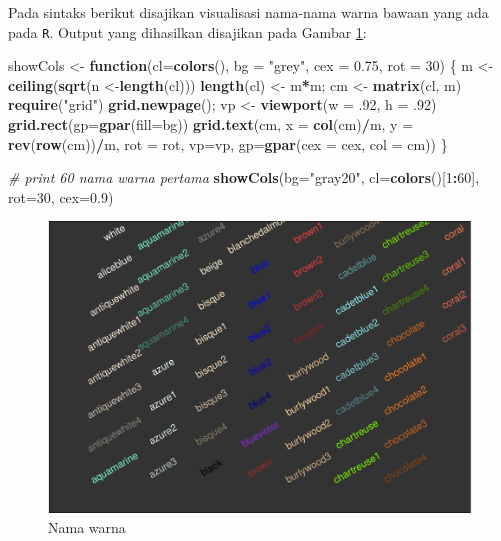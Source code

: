 \documentclass[]{book}
\newenvironment{Shaded}{\begin{snugshade}}{\end{snugshade}}
\newcommand{\KeywordTok}[1]{\textcolor[rgb]{0.13,0.29,0.53}{\textbf{#1}}}
\newcommand{\DataTypeTok}[1]{\textcolor[rgb]{0.13,0.29,0.53}{#1}}
\newcommand{\DecValTok}[1]{\textcolor[rgb]{0.00,0.00,0.81}{#1}}
\newcommand{\FloatTok}[1]{\textcolor[rgb]{0.00,0.00,0.81}{#1}}
\newcommand{\StringTok}[1]{\textcolor[rgb]{0.31,0.60,0.02}{#1}}
\newcommand{\CommentTok}[1]{\textcolor[rgb]{0.56,0.35,0.01}{\textit{#1}}}
\newcommand{\ControlFlowTok}[1]{\textcolor[rgb]{0.13,0.29,0.53}{\textbf{#1}}}
\newcommand{\OperatorTok}[1]{\textcolor[rgb]{0.81,0.36,0.00}{\textbf{#1}}}
\newcommand{\NormalTok}[1]{#1}
\begin{document}
Pada sintaks berikut disajikan visualisasi nama-nama warna bawaan yang
ada pada \texttt{R}. Output yang dihasilkan disajikan pada Gambar
\ref{fig:color}:

\begin{Shaded}
\begin{Highlighting}[]
\NormalTok{showCols <-}\StringTok{ }\ControlFlowTok{function}\NormalTok{(}\DataTypeTok{cl=}\KeywordTok{colors}\NormalTok{(), }\DataTypeTok{bg =} \StringTok{"grey"}\NormalTok{,}
                     \DataTypeTok{cex =} \FloatTok{0.75}\NormalTok{, }\DataTypeTok{rot =} \DecValTok{30}\NormalTok{) \{}
\NormalTok{    m <-}\StringTok{ }\KeywordTok{ceiling}\NormalTok{(}\KeywordTok{sqrt}\NormalTok{(n <-}\KeywordTok{length}\NormalTok{(cl)))}
    \KeywordTok{length}\NormalTok{(cl) <-}\StringTok{ }\NormalTok{m}\OperatorTok{*}\NormalTok{m; cm <-}\StringTok{ }\KeywordTok{matrix}\NormalTok{(cl, m)}
    \KeywordTok{require}\NormalTok{(}\StringTok{"grid"}\NormalTok{)}
    \KeywordTok{grid.newpage}\NormalTok{(); vp <-}\StringTok{ }\KeywordTok{viewport}\NormalTok{(}\DataTypeTok{w =}\NormalTok{ .}\DecValTok{92}\NormalTok{, }\DataTypeTok{h =}\NormalTok{ .}\DecValTok{92}\NormalTok{)}
    \KeywordTok{grid.rect}\NormalTok{(}\DataTypeTok{gp=}\KeywordTok{gpar}\NormalTok{(}\DataTypeTok{fill=}\NormalTok{bg))}
    \KeywordTok{grid.text}\NormalTok{(cm, }\DataTypeTok{x =} \KeywordTok{col}\NormalTok{(cm)}\OperatorTok{/}\NormalTok{m, }\DataTypeTok{y =} \KeywordTok{rev}\NormalTok{(}\KeywordTok{row}\NormalTok{(cm))}\OperatorTok{/}\NormalTok{m, }\DataTypeTok{rot =}\NormalTok{ rot,}
              \DataTypeTok{vp=}\NormalTok{vp, }\DataTypeTok{gp=}\KeywordTok{gpar}\NormalTok{(}\DataTypeTok{cex =}\NormalTok{ cex, }\DataTypeTok{col =}\NormalTok{ cm))}
\NormalTok{\}}

\CommentTok{# print 60 nama warna pertama}
\KeywordTok{showCols}\NormalTok{(}\DataTypeTok{bg=}\StringTok{"gray20"}\NormalTok{, }\DataTypeTok{cl=}\KeywordTok{colors}\NormalTok{()[}\DecValTok{1}\OperatorTok{:}\DecValTok{60}\NormalTok{], }\DataTypeTok{rot=}\DecValTok{30}\NormalTok{, }\DataTypeTok{cex=}\FloatTok{0.9}\NormalTok{)}
\end{Highlighting}
\end{Shaded}

\begin{figure}

{\centering \includegraphics[width=0.7\linewidth]{EnvStat_files/figure-latex/color-1} 

}

\caption{Nama warna}\label{fig:color}
\end{figure}
\end{document}
